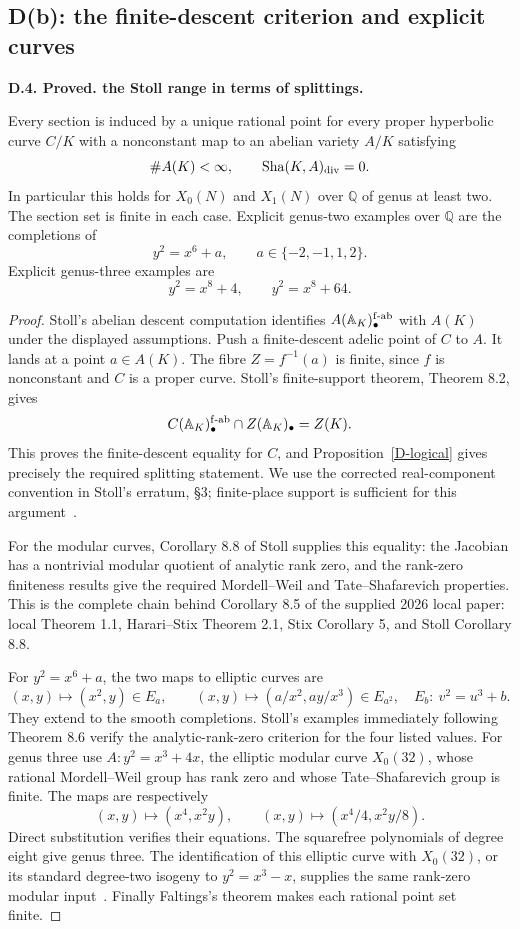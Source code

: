 \documentclass[11pt,oneside]{article}
\makeatletter
\newcommand{\Sha}{\operatorname{Sha}}
\newcounter{statementanchor}
\newenvironment{statement}[3]{%
 \refstepcounter{statementanchor}\def\@currentlabel{#1}%
 \par\addvspace{9pt}\noindent
 \textbf{#1. #2. #3.}\par\nobreak\noindent\ignorespaces
}{\par\addvspace{5pt}}
\makeatother
\begin{document}
\subsection{D(b): the finite-descent criterion and explicit curves}

\begin{statement}{D.4}{Proved}{the Stoll range in terms of splittings}
\label{st:D.4}
\label{D-Stoll}
Every section is induced by a unique rational point
for every proper hyperbolic curve $C/K$ with a
nonconstant map to an abelian variety $A/K$ satisfying
\[
 \#A(K)<\infty,\qquad
 \Sha(K,A)_{\rm div}=0 .
\]
In particular this holds for $X_0(N)$ and $X_1(N)$
over $\mathbb Q$ of genus at least two. The section
set is finite in each case. Explicit genus-two
examples over $\mathbb Q$ are the completions of
\[
 y^2=x^6+a,\qquad a\in\{-2,-1,1,2\}.
\]
Explicit genus-three examples are
\[
 y^2=x^8+4,\qquad y^2=x^8+64.
\]
\end{statement}
\begin{proof}
Stoll's abelian descent computation identifies
$A(\mathbb A_K)_\bullet^{\rm f\text{-}ab}$ with $A(K)$
under the displayed assumptions. Push a finite-descent
adelic point of $C$ to $A$. It lands at a point
$a\in A(K)$. The fibre $Z=f^{-1}(a)$ is finite,
since $f$ is nonconstant and $C$ is a proper curve.
Stoll's finite-support theorem, Theorem 8.2, gives
\[
 C(\mathbb A_K)_\bullet^{\rm f\text{-}ab}
 \cap Z(\mathbb A_K)_\bullet=Z(K).
\]
This proves the finite-descent equality for $C$,
and Proposition~\ref{D-logical} gives precisely
the required splitting statement. We use the
corrected real-component convention in Stoll's
erratum, \S3; finite-place support is sufficient
for this argument~\cite{StollErratum}.

For the modular curves, Corollary 8.8 of Stoll
supplies this equality: the Jacobian has a
nontrivial modular quotient of analytic rank zero,
and the rank-zero finiteness results give the
required Mordell--Weil and Tate--Shafarevich
properties. This is the complete chain behind
Corollary 8.5 of the supplied 2026 local paper:
local Theorem 1.1, Harari--Stix Theorem 2.1,
Stix Corollary 5, and Stoll Corollary 8.8.

For $y^2=x^6+a$, the two maps to elliptic curves are
\[
 (x,y)\longmapsto(x^2,y)\in E_a,\qquad
 (x,y)\longmapsto(a/x^2,ay/x^3)\in E_{a^2},
 \quad E_b:\ v^2=u^3+b .
\]
They extend to the smooth completions. Stoll's
examples immediately following Theorem 8.6
verify the analytic-rank-zero criterion for
the four listed values. For genus three use
$A:y^2=x^3+4x$, the elliptic modular curve
$X_0(32)$, whose rational Mordell--Weil group has
rank zero and whose Tate--Shafarevich group is finite.
The maps are respectively
\[
 (x,y)\longmapsto(x^4,x^2y),\qquad
 (x,y)\longmapsto(x^4/4,x^2y/8).
\]
Direct substitution verifies their equations.
The squarefree polynomials of degree eight
give genus three. The identification of this
elliptic curve with $X_0(32)$, or its standard
degree-two isogeny to $y^2=x^3-x$, supplies
the same rank-zero modular input~\cite{X032Model}.
Finally Faltings's theorem makes each rational
point set finite.
\end{proof}
\end{document}
